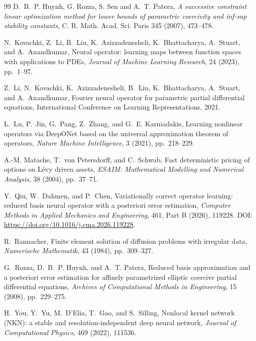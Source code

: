 \begin{thebibliography}{99}
D.~B.~P. Huynh, G. Rozza, S. Sen and A.~T. Patera, \emph{A successive constraint linear optimization
method for lower bounds of parametric coercivity and inf-sup stability constants},
C. R. Math. Acad. Sci. Paris 345 (2007), 473--478.

N.~Kovachki, Z.~Li, B.~Liu, K.~Azizzadenesheli, K.~Bhattacharya, A.~Stuart,
and A.~Anandkumar,
\newblock Neural operator: learning maps between function spaces with
applications to PDEs,
\newblock \emph{Journal of Machine Learning Research}, 24 (2023), pp.~1--97.

Z.~Li, N.~Kovachki, K.~Azizzadenesheli, B.~Liu, K.~Bhattacharya, A.~Stuart,
and A.~Anandkumar,
\newblock Fourier neural operator for parametric partial differential
equations,
\newblock International Conference on Learning Representations, 2021.

L.~Lu, P.~Jin, G.~Pang, Z.~Zhang, and G.~E. Karniadakis,
\newblock Learning nonlinear operators via DeepONet based on the universal
approximation theorem of operators,
\newblock \emph{Nature Machine Intelligence}, 3 (2021), pp.~218--229.

A.-M. Matache, T.~von Petersdorff, and C.~Schwab,
\newblock Fast deterministic pricing of options on L\'evy driven assets,
\newblock \emph{ESAIM: Mathematical Modelling and Numerical Analysis},
38 (2004), pp.~37--71.

Y.~Qiu, W.~Dahmen, and P.~Chen,
\newblock Variationally correct operator learning: reduced basis neural
operator with a posteriori error estimation,
\newblock \emph{Computer Methods in Applied Mechanics and Engineering},
461, Part B (2026), 119228.
DOI: \url{https://doi.org/10.1016/j.cma.2026.119228}.

R.~Rannacher,
\newblock Finite element solution of diffusion problems with irregular data,
\newblock \emph{Numerische Mathematik}, 43 (1984), pp.~309--327.

G.~Rozza, D.~B.~P. Huynh, and A.~T. Patera,
\newblock Reduced basis approximation and a posteriori error estimation for
affinely parametrized elliptic coercive partial differential equations,
\newblock \emph{Archives of Computational Methods in Engineering},
15 (2008), pp.~229--275.

H.~You, Y.~Yu, M.~D'Elia, T.~Gao, and S.~Silling,
\newblock Nonlocal kernel network (NKN): a stable and resolution-independent
deep neural network,
\newblock \emph{Journal of Computational Physics}, 469 (2022), 111536.

\end{thebibliography}
